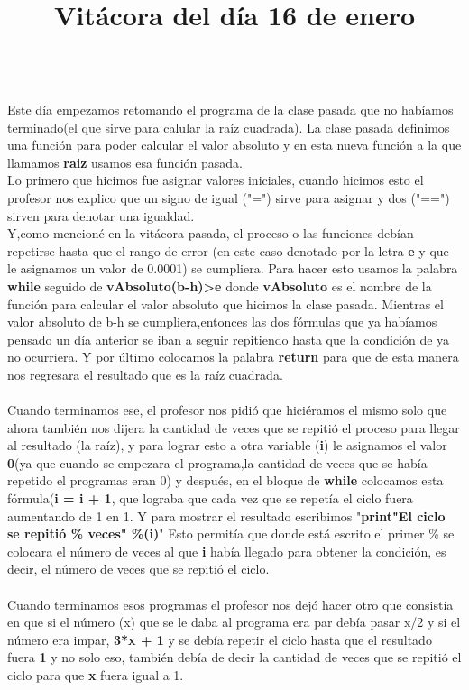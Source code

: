 \documentclass{article}
\begin{document}
	\title{\huge\textbf{Vitácora del día 16 de enero\\}} \\
	Este día empezamos retomando el programa de la clase pasada que no habíamos terminado(el que sirve para calular la raíz cuadrada). La clase pasada definimos una función para poder calcular el valor absoluto y en esta nueva función a la que llamamos \textbf{raiz} usamos esa función pasada. \\
	Lo primero que hicimos fue asignar valores iniciales, cuando hicimos esto el profesor nos explico que un signo de igual ("=") sirve para asignar y dos ("==") sirven para denotar una igualdad. \\
	Y,como mencioné en la vitácora pasada, el proceso o las funciones debían repetirse hasta que el rango de error (en este caso denotado por la letra \textbf{e} y que le asignamos un valor de 0.0001) se cumpliera. Para hacer esto usamos la palabra \textbf{while} seguido de \textbf{vAbsoluto(b-h)>e} donde \textbf{vAbsoluto} es el nombre de la función para calcular el valor absoluto que hicimos la clase pasada. Mientras el valor absoluto de b-h se cumpliera,entonces las dos fórmulas que ya habíamos pensado un día anterior se iban a seguir repitiendo hasta que la condición de ya no ocurriera. Y por último colocamos la palabra \textbf{return} para que de esta manera nos regresara el resultado que es la raíz cuadrada. \\ \\
	Cuando terminamos ese, el profesor nos pidió que hiciéramos el mismo solo que ahora también nos dijera la cantidad de veces que se repitió el proceso para llegar al resultado (la raíz), y para lograr esto a otra variable (\textbf{i}) le asignamos el valor \textbf{0}(ya que cuando se empezara el programa,la cantidad de veces que se había repetido el programas eran 0) y después, en el bloque de \textbf{while} colocamos esta fórmula(\textbf{i = i + 1}, que lograba que cada vez que se repetía el ciclo fuera aumentando de 1 en 1. Y para mostrar el resultado escribimos "\textbf{print"El ciclo se repitió \% veces" \%(i)}" Esto permitía que donde está escrito el primer \% se colocara el número de veces al que \textbf{i} había llegado para obtener la condición, es decir, el número de veces que se repitió el ciclo. \\ \\
	Cuando terminamos esos programas el profesor nos dejó hacer otro que consistía en que si el número (x) que se le daba al programa era par debía pasar x/2 y si el número era impar, \textbf{3*x + 1} y se debía repetir el ciclo hasta que el resultado fuera \textbf{1} y no solo eso, también debía de decir la cantidad de veces que se repitió el ciclo para que \textbf{x} fuera igual a 1. \\
\end{document}
